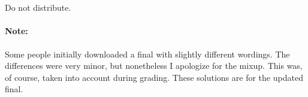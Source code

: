 \documentclass[12pt]{article}
\begin{document}

 \\
~\\
Do not distribute.
\paragraph{Note: } Some people initially downloaded a final with slightly different wordings. The differences were very minor, but nonetheless I apologize for the mixup. This was, of course, taken into account during grading. These solutions are for the updated final.

\end{document}
